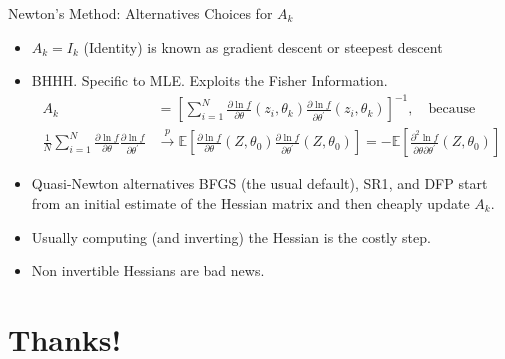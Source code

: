 \documentclass[aspectratio=169,11pt]{beamer}
\begin{document}
\begin{frame}{Newton's Method: Alternatives}
Choices for $A_k$
\begin{itemize}
\item $A_k= I_{k}$ (Identity) is known as \alert{gradient descent} or \alert{steepest descent}
\item BHHH. Specific to MLE. Exploits the \alert{Fisher Information}.
\begin{align*}
A _ { k } 
&= \left[ \sum _ { i = 1 } ^ { N } \frac { \partial \ln f } { \partial \theta } \left( z_i, \theta _ { k } \right) \frac { \partial \ln f } { \partial \theta ^ { \prime } } \left( z_i, \theta _ { k } \right) \right] ^ { - 1 }, \quad \text{because}\\
\frac{1}{N}\sum_{i=1}^N \frac { \partial \ln f } { \partial \theta } \frac { \partial \ln f } { \partial \theta ^ { \prime } } &\stackrel{p}{\longrightarrow} \mathbb { E } \left[ \frac { \partial \ln f } { \partial \theta } \left( Z , \theta _0 \right) \frac { \partial \ln f } { \partial \theta ^ { \prime } } \left( Z , \theta _0 \right) \right] = - \mathbb { E } \left[ \frac { \partial ^ { 2 } \ln f } { \partial \theta \partial \theta ^ { \prime } } \left( Z , \theta _0 \right) \right]
\end{align*}
\item Quasi-Newton alternatives \alert{BFGS} (the usual default), \alert{SR1}, and \alert{DFP} start from an initial estimate of the Hessian matrix and then cheaply update $A_k$.
\item Usually computing (and inverting) the Hessian is the costly step.
\item Non invertible Hessians are bad news.
\end{itemize}
\end{frame}


\section*{Thanks!}
\end{document}
